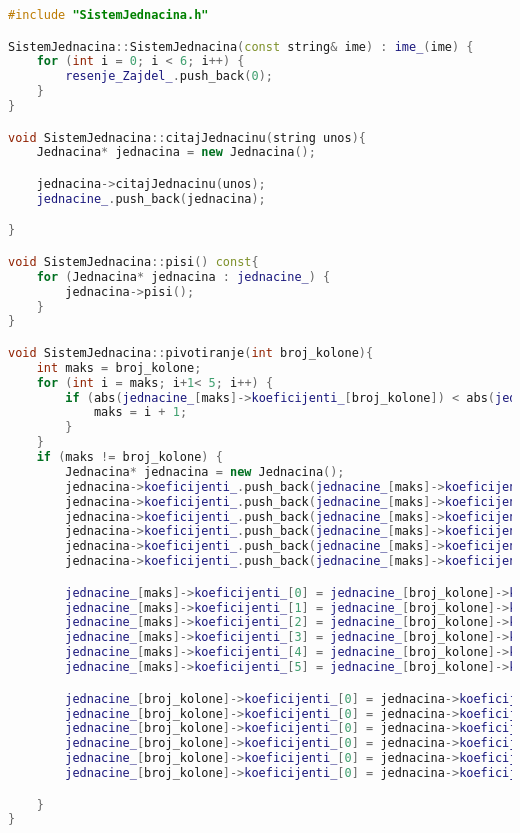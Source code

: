 \documentclass[12pt,leqno,a4paper]{article}
\begin{document}
\begin{lstlisting}[language=C++ ]
#include "SistemJednacina.h"

SistemJednacina::SistemJednacina(const string& ime) : ime_(ime) {
	for (int i = 0; i < 6; i++) {
		resenje_Zajdel_.push_back(0);
	}
}

void SistemJednacina::citajJednacinu(string unos){
	Jednacina* jednacina = new Jednacina();

	jednacina->citajJednacinu(unos);
	jednacine_.push_back(jednacina);

}

void SistemJednacina::pisi() const{
	for (Jednacina* jednacina : jednacine_) {
		jednacina->pisi();
	}
}

void SistemJednacina::pivotiranje(int broj_kolone){
	int maks = broj_kolone;
	for (int i = maks; i+1< 5; i++) {
		if (abs(jednacine_[maks]->koeficijenti_[broj_kolone]) < abs(jednacine_[i + 1]->koeficijenti_[broj_kolone])) {
			maks = i + 1;
		}
	}
	if (maks != broj_kolone) {
		Jednacina* jednacina = new Jednacina();
		jednacina->koeficijenti_.push_back(jednacine_[maks]->koeficijenti_[0]);
		jednacina->koeficijenti_.push_back(jednacine_[maks]->koeficijenti_[1]);
		jednacina->koeficijenti_.push_back(jednacine_[maks]->koeficijenti_[2]);
		jednacina->koeficijenti_.push_back(jednacine_[maks]->koeficijenti_[3]);
		jednacina->koeficijenti_.push_back(jednacine_[maks]->koeficijenti_[4]);
		jednacina->koeficijenti_.push_back(jednacine_[maks]->koeficijenti_[5]);

		jednacine_[maks]->koeficijenti_[0] = jednacine_[broj_kolone]->koeficijenti_[0];
		jednacine_[maks]->koeficijenti_[1] = jednacine_[broj_kolone]->koeficijenti_[1];
		jednacine_[maks]->koeficijenti_[2] = jednacine_[broj_kolone]->koeficijenti_[2];
		jednacine_[maks]->koeficijenti_[3] = jednacine_[broj_kolone]->koeficijenti_[3];
		jednacine_[maks]->koeficijenti_[4] = jednacine_[broj_kolone]->koeficijenti_[4];
		jednacine_[maks]->koeficijenti_[5] = jednacine_[broj_kolone]->koeficijenti_[5];

		jednacine_[broj_kolone]->koeficijenti_[0] = jednacina->koeficijenti_[0];
		jednacine_[broj_kolone]->koeficijenti_[0] = jednacina->koeficijenti_[1];
		jednacine_[broj_kolone]->koeficijenti_[0] = jednacina->koeficijenti_[2];
		jednacine_[broj_kolone]->koeficijenti_[0] = jednacina->koeficijenti_[3];
		jednacine_[broj_kolone]->koeficijenti_[0] = jednacina->koeficijenti_[4];
		jednacine_[broj_kolone]->koeficijenti_[0] = jednacina->koeficijenti_[5];

	}
}


\end{lstlisting}
\end{document}
